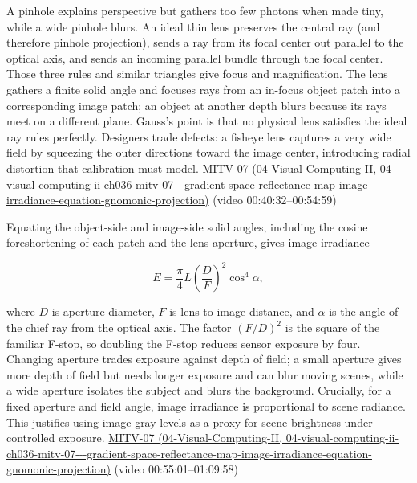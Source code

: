 A pinhole explains perspective but gathers too few photons when made tiny, while a wide pinhole blurs. An ideal thin lens preserves the central ray (and therefore pinhole projection), sends a ray from its focal center out parallel to the optical axis, and sends an incoming parallel bundle through the focal center. Those three rules and similar triangles give focus and magnification. The lens gathers a finite solid angle and focuses rays from an in-focus object patch into a corresponding image patch; an object at another depth blurs because its rays meet on a different plane. Gauss's point is that no physical lens satisfies the ideal ray rules perfectly. Designers trade defects: a fisheye lens captures a very wide field by squeezing the outer directions toward the image center, introducing radial distortion that calibration must model. \href{../04-Visual-Computing-II/main.pdf\#nameddest=04-visual-computing-ii-ch036-mitv-07---gradient-space-reflectance-map-image-irradiance-equation-gnomonic-projection}{MITV-07 (04-Visual-Computing-II, 04-visual-computing-ii-ch036-mitv-07-\/-\/-gradient-space-reflectance-map-image-irradiance-equation-gnomonic-projection)} (video 00:40:32--00:54:59)

Equating the object-side and image-side solid angles, including the cosine foreshortening of each patch and the lens aperture, gives image irradiance

\[
E=\frac{\pi}{4}L\left(\frac{D}{F}\right)^2\cos^4\alpha,
\]

where \(D\) is aperture diameter, \(F\) is lens-to-image distance, and \(\alpha\) is the angle of the chief ray from the optical axis. The factor \((F/D)^2\) is the square of the familiar F-stop, so doubling the F-stop reduces sensor exposure by four. Changing aperture trades exposure against depth of field; a small aperture gives more depth of field but needs longer exposure and can blur moving scenes, while a wide aperture isolates the subject and blurs the background. Crucially, for a fixed aperture and field angle, image irradiance is proportional to scene radiance. This justifies using image gray levels as a proxy for scene brightness under controlled exposure. \href{../04-Visual-Computing-II/main.pdf\#nameddest=04-visual-computing-ii-ch036-mitv-07---gradient-space-reflectance-map-image-irradiance-equation-gnomonic-projection}{MITV-07 (04-Visual-Computing-II, 04-visual-computing-ii-ch036-mitv-07-\/-\/-gradient-space-reflectance-map-image-irradiance-equation-gnomonic-projection)} (video 00:55:01--01:09:58)


